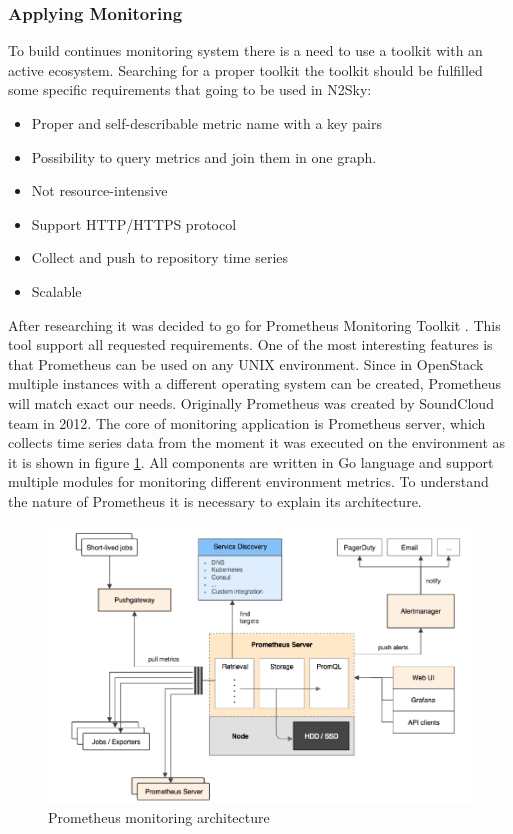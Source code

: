 \subsubsection{Applying Monitoring}\label{Applying Monitoring}
To build continues monitoring system there is a need to use a toolkit with an active ecosystem.  Searching for a proper toolkit the toolkit should be fulfilled some specific requirements that going to be used in N2Sky:
\begin{itemize}
\item Proper and self-describable metric name with a key pairs
\item Possibility to query metrics and join them in one graph.
\item Not resource-intensive
\item Support HTTP/HTTPS protocol
\item Collect and push to repository time series
\item Scalable
\end{itemize}

After researching it was decided to go for Prometheus Monitoring Toolkit \cite{alert_overview}. This tool support all requested requirements. One of the most interesting features is that Prometheus can be used on any UNIX environment. Since in OpenStack multiple instances with a different operating system can be created, Prometheus will match exact our needs. 
Originally Prometheus was created by SoundCloud team in 2012. The core of monitoring application is Prometheus server, which collects time series data from the moment it was executed on the environment as it is shown in figure \ref{fig:prometherus_arch}. All components are written in Go language and support multiple modules for monitoring different environment metrics. 
To understand the nature of Prometheus it is necessary to explain its architecture. 

\begin{figure}[htbp]
\begin{center}
  \includegraphics[width=\linewidth]{components/3/prometherus_arch.png}
  \caption{Prometheus monitoring architecture}
  \label{fig:prometherus_arch}
\end{center}
\end{figure}

